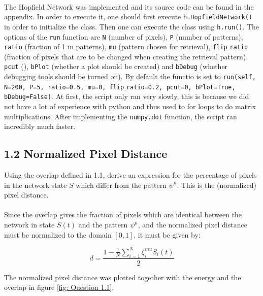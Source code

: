 \paragraph*{}

\normalsize
The Hopfield Network was implemented and its source code can be found in the appendix. In order to execute it, one should first execute \texttt{h=HopfieldNetwork()} in order to initialize the class. Then one can execute the class using \texttt{h.run()}. The options of the \texttt{run} function are \texttt{N} (number of pixels), \texttt{P} (number of patterns), \texttt{ratio} (fraction of 1 in patterns), \texttt{mu} (pattern chosen for retrieval), \texttt{flip$\_$ratio} (fraction of pixels that are to be changed when creating the retrieval pattern), \texttt{pcut} (), \texttt{bPlot} (whether a plot should be created) and \texttt{bDebug} (whether debugging tools should be turned on).
By default the functio is set to \texttt{run(self, N=200, P=5, ratio=0.5, mu=0, flip$\_$ratio=0.2, pcut=0, bPlot=True, bDebug=False)}.
At first, the script only ran very slowly, this is because we did not have a lot of experience with python and thus used to for loops to do matrix multiplications. After implementing the \texttt{numpy.dot} function, the script ran incredibly much faster. 

\subsection{1.2 Normalized Pixel Distance}
\small
\begin{itshape}
Using the overlap defined in 1.1, derive an expression for the percentage of pixels in the network state $S$ which differ from the pattern $\psi^\mu$. This is the (normalized) pixel distance.
\end{itshape}

\paragraph*{}
\normalsize
Since the overlap gives the fraction of pixels which are identical between the network in state $S(t)$ and the pattern $\psi^\mu$, and the normalized pixel distance must be normalized to the domain $[0,1]$, it must be given by:

\begin{equation}
d=\frac{1- \frac{1}{N} \sum_{i=1}^N \xi_i^{mu} S_i(t)}{2}
\end{equation}

The normalized pixel distance was plotted together with the energy and the overlap in figure \ref{fig: Question 1.1}.

